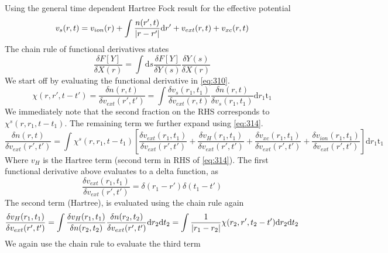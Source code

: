 \begin{solution}
Using the general time dependent Hartree Fock result for the effective potential
\begin{equation}
    v_s(r,t) = v_{ion}(r) + \int \frac{n(r',t)}{\abs{r-r'}} \mathrm{d}r' + v_{ext}(r,t) + v_{xc}(r,t)
    \label{eq:314}
\end{equation}
The chain rule of functional derivatives states
\begin{equation}
    \frac{\delta F[Y]}{\delta X(r)} = \int \mathrm{d}s \frac{\delta F[Y]}{\delta Y(s)} \frac{\delta Y(s)}{\delta X(r)}
    \label{eq:315}
\end{equation}
We start off by evaluating the functional derivative in \eqref{eq:310}.
\begin{equation}
   \chi(r,r',t-t') =  \dfrac{\delta n(r,t)}{\delta v_{ext}(r',t')} = \int \dfrac{\delta v_s(r_1,t_1)}{\delta v_{ext}(r,t)}\dfrac{\delta n(r,t)}{\delta v_{s}(r_1,t_1)}\mathrm{d}r_1\mathrm{t_1}
    \label{eq:316}
\end{equation}
We immediately note that the second fraction on the RHS corresponds to $\chi^{s}(r,r_1,t-t_1)$. The remaining term we further expand using \eqref{eq:314}.
{\small
\begin{equation}
    \dfrac{\delta n(r,t)}{\delta v_{ext}(r',t')} = \int \chi^{s}(r,r_1,t-t_1) \left[\dfrac{\delta v_{ext}(r_1,t_1)}{\delta v_{ext}(r',t')} + \dfrac{\delta v_H(r_1,t_1)}{\delta v_{ext}(r',t')} + \dfrac{\delta v_{xc}(r_1,t_1)}{\delta v_{ext}(r',t')} + \dfrac{\delta v_{ion}(r_1,t_1)}{\delta v_{ext}(r',t')} \right]\mathrm{d}r_1\mathrm{t_1}
    \label{eq:317}
\end{equation}}
Where $v_H$ is the Hartree term (second term in RHS of \eqref{eq:314}). The first functional derivative above evaluates to a delta function, as
\begin{equation}
    \dfrac{\delta v_{ext}(r_1,t_1)}{\delta v_{ext}(r',t')} = \delta(r_1-r') \delta(t_1-t')
\end{equation}
The second term (Hartree), is evaluated using the chain rule again
\begin{equation}
    \dfrac{\delta v_H(r_1,t_1)}{\delta v_{ext}(r',t')} = \int \dfrac{\delta v_H(r_1,t_1)}{\delta n(r_2,t_2)} \dfrac{\delta n(r_2,t_2)}{\delta v_{ext}(r',t')}      \mathrm{d} r_2 \mathrm{d} t_2 = \int \dfrac{1}{\abs{r_1 - r_2}}\chi(r_2,r',t_2-t')\mathrm{d}r_2\mathrm{d}t_2
\end{equation}
We again use the chain rule to evaluate the third term
{\small
\begin{equation}

\end{equation}}
\end{solution}
